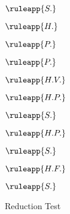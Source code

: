 \begin{sidewaysfigure}
  \centering
  \caption[Caption]{Reduction Test}
  \begin{minipage}[t]{0.15\textwidth}
    \begin{snippet}

      $\ruleapp{S.}$

      $\ruleapp{H.}$

      $\ruleapp{P.}$

      $\ruleapp{P.}$



      $\ruleapp{H.V.}$



      $\ruleapp{H.P.}$


      $\ruleapp{S.}$


      $\ruleapp{H.P.}$


      $\ruleapp{S.}$

      $\ruleapp{H.F.}$


      $\ruleapp{S.}$
    \end{snippet}
  \end{minipage} \hfill
  \begin{minipage}[t]{0.4\textwidth}
    
  \end{minipage} \hfill
  \begin{minipage}[t]{0.45\textwidth}
    
  \end{minipage}
\end{sidewaysfigure}

% 
% 
